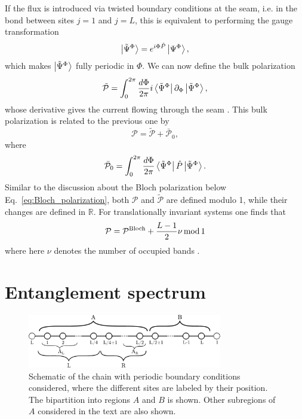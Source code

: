 \documentclass[twocolumn,amsmath,longbibliography,amssymb,superscriptaddress]{revtex4-1}
\begin{document}
If the flux is introduced via twisted boundary conditions at the seam, i.e. in the bond between sites $j=1$ and $j=L$, this is equivalent to performing the gauge transformation
\begin{align}\label{eq:Psi_tilde}
\ket{\tilde{\Psi}^\Phi}=e^{i\Phi \hat{P}}\ket{\Psi^\Phi},
\end{align}
which makes $\ket{\tilde{\Psi}^\Phi}$ fully periodic in $\Phi$. We can now define the bulk polarization
\begin{equation}
\tilde{\mathcal{P}} = \int_0^{2\pi}\frac{d\Phi}{2\pi} i\bra{\tilde{\Psi}^\Phi}\partial_\Phi \ket{\tilde{\Psi}^\Phi},
\label{eq:p_tilde}
\end{equation}
whose derivative gives the current flowing through the seam \cite{Watanabe2018}. This bulk polarization is related to the previous one by 
\begin{equation}
\mathcal{P}= \tilde{\mathcal{P}}+\bar{\mathcal{P}}_0,
\end{equation} 
where
\begin{equation}
\bar {\mathcal{P}}_0= \int_0^{2\pi}\frac{d\Phi}{2\pi} \bra{\tilde{\Psi}^\Phi}\hat{P}\ket{\tilde{\Psi}^\Phi}.
\end{equation} 
Similar to the discussion about the Bloch polarization below Eq.~\eqref{eq:Bloch_polarization}, both $\mathcal{P}$ and $\tilde{\mathcal{P}}$ are defined modulo 1, while their changes are defined in $\mathbb{R}$. For translationally invariant systems one finds that
\begin{equation}
\mathcal{P} = \mathcal{P}^{\rm Bloch}+\frac{L-1}{2}\nu \, {\rm mod} \, 1
\end{equation}
where here $\nu$ denotes the number of occupied bands \cite{Watanabe2018}. 



\section{Entanglement spectrum}
\label{section:ES}

\begin{figure}[t]
	\centering
	\includegraphics[width=85mm]{chain.pdf}
	\caption{Schematic of the chain with periodic boundary conditions considered, where the different sites are labeled by their position. The bipartition into regions $A$ and $B$ is shown. Other subregions of $A$ considered in the text are also shown. }
\label{fig:chain}
\end{figure}
\end{document}
